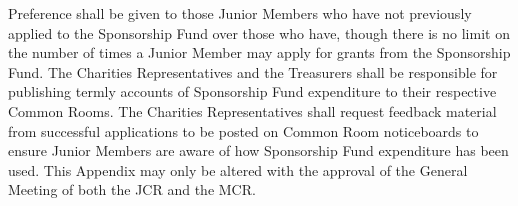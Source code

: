\appnpara Preference shall be given to those Junior Members who have not previously applied to the Sponsorship Fund over those who have, though there is no limit on the number of times a Junior Member may apply for grants from the Sponsorship Fund.
\appnpara The Charities Representatives and the Treasurers shall be responsible for publishing termly accounts of Sponsorship Fund expenditure to their respective Common Rooms.  The Charities Representatives shall request feedback material from successful applications to be posted on Common Room noticeboards to ensure Junior Members are aware of how Sponsorship Fund expenditure has been used.
\appnpara This Appendix may only be altered with the approval of the General Meeting of both the JCR and the MCR.
